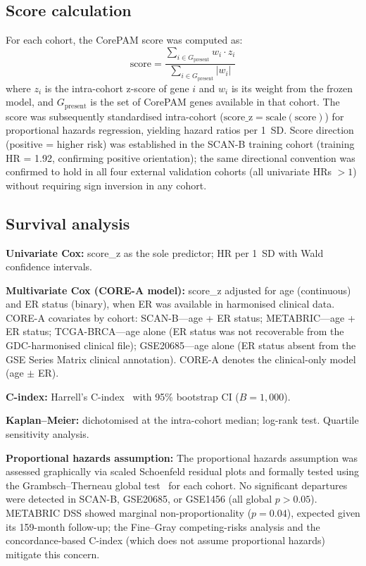 \documentclass[referee,lineno,pdflatex,sn-vancouver-num]{sn-jnl}
\begin{document}
\subsection{Score calculation}\label{subsec:score-calculation}

For each cohort, the CorePAM score was computed as:
\begin{equation}
\text{score} = \frac{\sum_{i \in G_{\text{present}}} w_i \cdot z_i}{\sum_{i \in G_{\text{present}}} |w_i|}
\end{equation}
where $z_i$ is the intra-cohort z-score of gene $i$ and $w_i$ is its weight from the frozen model, and $G_{\text{present}}$ is the set of CorePAM genes available in that cohort. The score was subsequently standardised intra-cohort ($\text{score\_z} = \text{scale}(\text{score})$) for proportional hazards regression, yielding hazard ratios per 1~SD. Score direction (positive = higher risk) was established in the SCAN-B training cohort (training HR = 1.92, confirming positive orientation); the same directional convention was confirmed to hold in all four external validation cohorts (all univariate HRs $> 1$) without requiring sign inversion in any cohort.

\subsection{Survival analysis}\label{subsec:survival-analysis}

\textbf{Univariate Cox:} score\_z as the sole predictor; HR per 1~SD with Wald confidence intervals.

\textbf{Multivariate Cox (CORE-A model):} score\_z adjusted for age (continuous) and ER status (binary), when ER was available in harmonised clinical data. CORE-A covariates by cohort: SCAN-B---age + ER status; METABRIC---age + ER status; TCGA-BRCA---age alone (ER status was not recoverable from the GDC-harmonised clinical file); GSE20685---age alone (ER status absent from the GSE Series Matrix clinical annotation). CORE-A denotes the clinical-only model (age $\pm$ ER).

\textbf{C-index:} Harrell's C-index~\cite{harrell1982} with 95\% bootstrap CI ($B = 1{,}000$).

\textbf{Kaplan--Meier:} dichotomised at the intra-cohort median; log-rank test. Quartile sensitivity analysis.

\textbf{Proportional hazards assumption:} The proportional hazards assumption was assessed graphically via scaled Schoenfeld residual plots and formally tested using the Grambsch--Therneau global test~\cite{grambsch1994} for each cohort. No significant departures were detected in SCAN-B, GSE20685, or GSE1456 (all global $p > 0.05$). METABRIC DSS showed marginal non-proportionality ($p = 0.04$), expected given its 159-month follow-up; the Fine--Gray competing-risks analysis and the concordance-based C-index (which does not assume proportional hazards) mitigate this concern.
\end{document}

